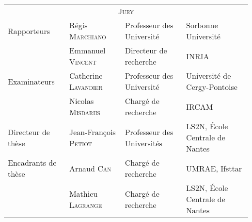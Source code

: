 \begin{cover}

  \noindent
  \begin{tabular}{llll} %
    \multicolumn{4}{c}{\scshape\color{teal}\Large Jury} \\[10pt]
    Rapporteurs & Régis \textsc{Marchiano} & Professeur des Université & Sorbonne Université\\
                & Emmanuel \textsc{Vincent} & Directeur de recherche & INRIA \\[10pt]
    Examinateurs & Catherine \textsc{Lavandier} & Professeur des Université & Université de Cergy-Pontoise
    \\
                & Nicolas \textsc{Misdariis} & Chargé de recherche & IRCAM \\[10pt]
    Directeur de thèse & Jean-François \textsc{Petiot} & Professeur des Universités & LS2N, École Centrale de Nantes \\
    Encadrants de thèse & Arnaud \textsc{Can} & Chargé de recherche & UMRAE, Ifsttar \\
     & Mathieu \textsc{Lagrange} & Chargé de recherche & LS2N, École Centrale de Nantes 
  \end{tabular}
\end{cover}